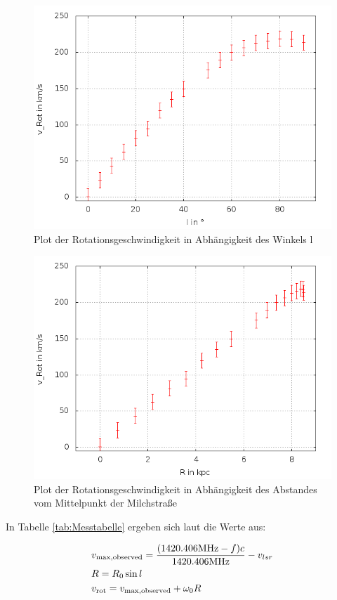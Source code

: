 \begin{figure}
		\includegraphics[width=.9\textwidth]{images/vRotberl}
\caption{ Plot der Rotationsgeschwindigkeit in Abhängigkeit des Winkels l }
\label{fig:vRot_l}
\end{figure}

\begin{figure}
		\includegraphics[width=.9\textwidth]{images/vRotberR}
\caption{ Plot der Rotationsgeschwindigkeit in Abhängigkeit des Abstandes vom Mittelpunkt der Milchstraße }
\label{fig:vRot_R}
\end{figure}

In Tabelle \ref{tab:Messtabelle} ergeben sich laut \cite{ronomischesPraktikum} die Werte aus:

\begin{align}
&v_{\mathrm{max,observed}} = \frac{(1420.406 \mathrm{MHz} - f) c}{1420.406 \mathrm{MHz}} - v_{lsr} \\
&R = R_0 \sin l \\
&v_{\mathrm{rot}} = v_{\mathrm{max,observed}} + \omega_0 R
\end{align}

